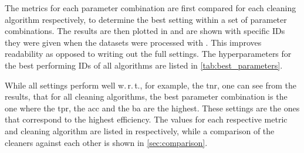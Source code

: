 The metrics for each parameter combination are first compared for each cleaning algorithm respectively,
to determine the best setting within a set of parameter combinations. The results are then plotted in
and are shown with specific IDs they were given when the datasets were processed with \ctapipe.
This improves readability as opposed to writing out the full settings. The hyperparameters for the best performing
IDs of all algorithms are listed in \autoref{tab:best_parameters}.

While all settings perform well w.\,r.\,t., for example, the \gls{tnr}, one can see from the results, that for all cleaning
algorithms, the best parameter combination is the one where the \gls{tpr}, the \gls{acc} and the \gls{ba}
are the highest. These settings are the ones that correspond to the highest efficiency.
The values for each respective metric and cleaning algorithm are listed in
 respectively, while
a comparison of the cleaners against each other is shown in \autoref{sec:comparison}.
\begin{table}
    \centering
    \caption{Results for the metrics of \tailcuts{}. One can see, that the best results are obtained
    for the setting with ID~101.}
    \label{tab:metrics_tail}
\end{table}

